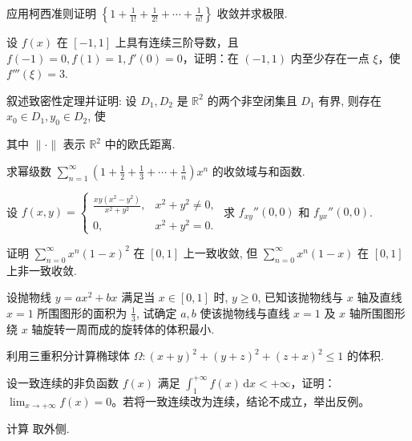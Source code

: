 应用柯西准则证明  $\left\{1+\frac{1}{1!}+\frac{1}{2!}+\cdots+\frac{1}{n!}\right\}$  收敛并求极限.\par
设 $f(x)$ 在 $[-1, 1]$ 上具有连续三阶导数，且 $f(-1) = 0, f(1) = 1, f'(0) = 0$，证明：在 $(-1, 1)$ 内至少存在一点 $\xi$，使 $f'''(\xi) = 3$.\par
\par{}
叙述致密性定理并证明: 设 $D_{1}, D_{2}$ 是 $\mathbb{R}^{2}$ 的两个非空闭集且 $D_{1}$ 有界, 则存在 $x_{0} \in D_{1}, y_{0} \in D_{2}$, 使\par
\nopagebreak[4]
其中 $\| \cdot \|$ 表示 $\mathbb{R}^2$ 中的欧氏距离.\par
求幂级数  $\sum_{n=1}^{\infty}\left(1+\frac{1}{2}+\frac{1}{3}+\cdots+\frac{1}{n}\right)x^{n}$  的收敛域与和函数.\par
设 $f(x, y) = \begin{cases} \frac{xy(x^2 - y^2)}{x^2 + y^2}, & x^2 + y^2 \neq 0, \\ 0, & x^2 + y^2 = 0. \end{cases}$ 求 $f_{xy}''(0, 0)$ 和 $f_{yx}''(0, 0)$.\par
证明 $\sum_{n=0}^{\infty} x^{n}(1 - x)^{2}$ 在 $[0,1]$ 上一致收敛, 但 $\sum_{n=0}^{\infty} x^{n}(1 - x)$ 在 $[0,1]$ 上非一致收敛.\par
设抛物线 $y = ax^2 + bx$ 满足当 $x \in [0,1]$ 时, $y \geq 0$, 已知该抛物线与 $x$ 轴及直线 $x = 1$ 所围图形的面积为 $\frac{1}{3}$, 试确定 $a, b$ 使该抛物线与直线 $x = 1$ 及 $x$ 轴所围图形绕 $x$ 轴旋转一周而成的旋转体的体积最小.\par
利用三重积分计算椭球体 $\Omega: (x + y)^2 + (y + z)^2 + (z + x)^2 \leq 1$ 的体积.\par
设一致连续的非负函数 $f(x)$ 满足 $\int_{1}^{+\infty} f(x) \, \mathrm{d}x < +\infty$，证明：$\lim_{x \to +\infty} f(x) = 0$。若将一致连续改为连续，结论不成立，举出反例。\par
计算  取外侧.\par
